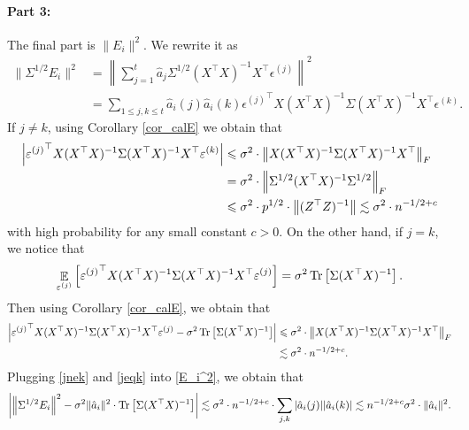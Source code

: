 	\paragraph{Part 3:} The final part is $\|E_i\|^2$. We rewrite it as 
	\begin{align}
	\|\Sigma^{1/2}E_i\|^2 &= \left\|\sum_{j=1}^t \hat{a}_j \Sigma^{1/2}(X^{\top} X)^{-1} X^{\top} \epsilon^{(j)}\right\|^2 \nonumber\\
	& = \sum_{1\le j , k \le t}\hat a_i(j) \hat a_i(k)  {\epsilon^{(j)}}^\top X(X^{\top} X)^{-1}\Sigma (X^{\top} X)^{-1} X^{\top} {\epsilon^{(k)}}.\label{E_i^2}
	\end{align}
	If $j\ne k$, using Corollary \ref{cor_calE} we obtain that 
	\begin{align}
	\left|{\varepsilon^{(j)}}^\top X(X^{\top} X)^{-1}\Sigma (X^{\top} X)^{-1} X^{\top} {\varepsilon^{(k)}} \right| &\leqslant \sigma^2 \cdot \left\| X(X^{\top} X)^{-1}\Sigma (X^{\top} X)^{-1} X^{\top}  \right\|_{F} \nonumber\\
	& =\sigma^2 \cdot \left\| \Sigma^{1/2}(X^{\top} X)^{-1}\Sigma^{1/2} \right\|_{F} \nonumber\\
	&  \leqslant \sigma^2 \cdot p^{1/2} \cdot \left\| (Z^{\top} Z)^{-1} \right\| \lesssim \sigma^2 \cdot n^{-1/2+c} \label{jnek}
	\end{align}
	with high probability for any small constant $c>0$. On the other hand, if $j=k$, we notice that 
	$$\mathop{\mathbb{E}}_{\varepsilon^{(j)}}\left[ {\varepsilon^{(j)}}^\top X(X^{\top} X)^{-1}\Sigma (X^{\top} X)^{-1} X^{\top} \varepsilon^{(j)} \right]= \sigma^2\operatorname{Tr}\left[\Sigma(X^\top X)^{-1}\right] .$$
	Then using Corollary \ref{cor_calE}, we obtain that 
	\begin{align}
	\left|{\varepsilon^{(j)}}^\top X(X^{\top} X)^{-1}\Sigma (X^{\top} X)^{-1} X^{\top} {\varepsilon^{(j)}} -\sigma^2\operatorname{Tr}\left[\Sigma(X^\top X)^{-1}\right]\right| &\leqslant \sigma^2 \cdot \left\| X(X^{\top} X)^{-1}\Sigma (X^{\top} X)^{-1} X^{\top}  \right\|_{F} \nonumber\\
	& \lesssim \sigma^2 \cdot n^{-1/2+c} . \label{jeqk}
	\end{align}
	Plugging \eqref{jnek} and \eqref{jeqk} into \eqref{E_i^2}, we obtain that 
	\begin{align*}
		{\left| {\left\| \Sigma^{1/2} E_i \right\|^2 -  \sigma^2 \|\hat a_i\|^2 \cdot\operatorname{Tr}\left[\Sigma(X^\top X)^{-1}\right]} \right|} \lesssim  \sigma^2 \cdot n^{-1/2+c} \cdot \sum_{j,k}|\hat a_i(j)||\hat a_i(k)|\lesssim  n^{-1/2+c} \sigma^2 \cdot  \|\hat a_i\|^2.
	\end{align*}
	
